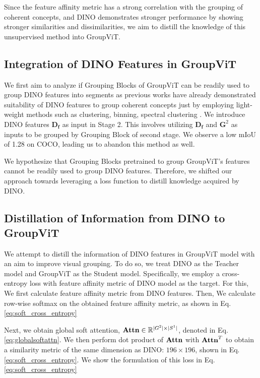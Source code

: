 Since the feature affinity metric has a strong correlation with the grouping of coherent concepts, and DINO demonstrates stronger performance by showing stronger similarities and dissimilarities, we aim to distill the knowledge of this unsupervised method into GroupViT.


\subsection{Integration of DINO Features in GroupViT}

We first aim to analyze if Grouping Blocks of GroupViT can be readily used to group DINO features into segments as previous works have already demonstrated suitability of DINO features to group coherent concepts just by employing light-weight methods such as clustering, binning, spectral clustering \cite{amir2021deep}\cite{melas2022deep}. We introduce DINO features $\mathbf{D_f}$ as input in Stage 2. This involves utilizing $\mathbf{D_f}$ and $\mathbf{G}^2$ as inputs to be grouped by Grouping Block of second stage. We observe a low mIoU of 1.28 on COCO, leading us to abandon this method as well.

We hypothesize that Grouping Blocks pretrained to group GroupViT's features cannot be readily used to group DINO features.  Therefore, we shifted our approach towards leveraging a loss function to distill knowledge acquired by DINO.


\subsection{Distillation of Information from DINO to GroupViT}
We attempt to distill the information of DINO features in GroupViT model with an aim to improve visual grouping. To do so, 
we treat DINO as the Teacher model and GroupViT as the Student model. Specifically, we employ a cross-entropy loss with feature affinity metric of DINO model as the target. For this,  We first calculate feature affinity metric from DINO features. Then, We calculate row-wise softmax on the obtained feature affinity metric, as shown in Eq. \ref{eq:soft_cross_entropy}

Next, we obtain global soft attention, $\text{\textbf{Attn}} \in \mathbb{R}^{|G^2| \times |S^1|}$, denoted in Eq. \ref{eq:globalsoftattn}. We then perform dot product of $\text{\textbf{Attn}}$ with $\text{\textbf{Attn}}^T$ to obtain  a similarity metric of the same dimension as DINO: $196 \times 196$, shown in Eq. \ref{eq:soft_cross_entropy}. We show the formulation of this loss in Eq. \ref{eq:soft_cross_entropy}


